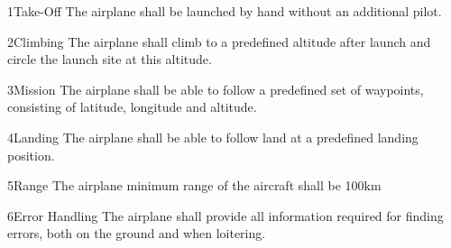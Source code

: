 \req
    {1}{Take-Off}
    {
        The airplane shall be launched by hand without an additional pilot. 
    }
    {}
    {}

\req
    {2}{Climbing}
    {
        The airplane shall climb to a predefined altitude after launch and
        circle the launch site at this altitude. 
    }
    {}
    {}

\req
    {3}{Mission}
    {
        The airplane shall be able to follow a predefined set of waypoints, consisting
        of latitude, longitude and altitude. 
    }
    {}
    {}

\req
    {4}{Landing}
    {
        The airplane shall be able to follow land at a predefined landing position.    
    }
    {}
    {}

\req
    {5}{Range}
    {
        The airplane minimum range of the aircraft shall be 100km
    }
    {}
    {}

\req
    {6}{Error Handling}
    {
        The airplane shall provide all information required for finding
        errors, both on the ground and when loitering.
    }
    {}
    {}